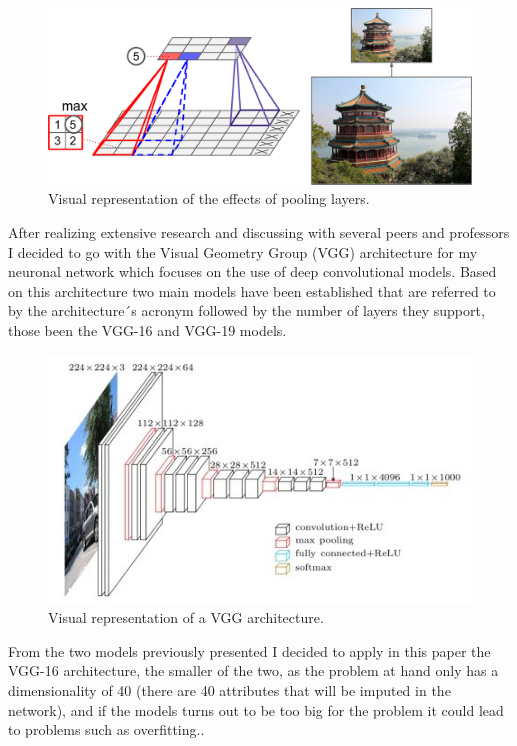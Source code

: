 \documentclass[12pt, a4paper]{article}
\begin{document}
	\begin{figure}[H]
		\centering
		\label{MaxPoolLayer}
		\includegraphics{img/maxPoolingLayer.png}
		\caption{Visual representation of the effects of pooling layers. \cite{handsonmachinelearning}}
	\end{figure}

	After realizing extensive research and discussing with several peers and professors I decided to go with the Visual Geometry Group (VGG) architecture for my neuronal network which focuses on the use of deep convolutional models. Based on this architecture two main models have been established that are referred to by the architecture´s acronym followed by the number of layers they support, those been the VGG-16 and VGG-19 models.\cite{VGGinfo}
	
	\vspace{5mm}
	\begin{figure}[H]
		\label{VGGArchitecture}
		\includegraphics[width=140mm]{img/vgg-neural-network-architecture.jpg}
		\caption{Visual representation of a VGG architecture. \cite{VGGimg}}
	\end{figure}
	\vspace{5mm}

	From the two models previously presented I decided to apply in this paper the VGG-16 architecture, the smaller of the two, as the problem at hand only has a dimensionality of 40 (there are 40 attributes that will be imputed in the network), and if the models turns out to be too big for the problem it could lead to problems such as overfitting..
	
\end{document}
